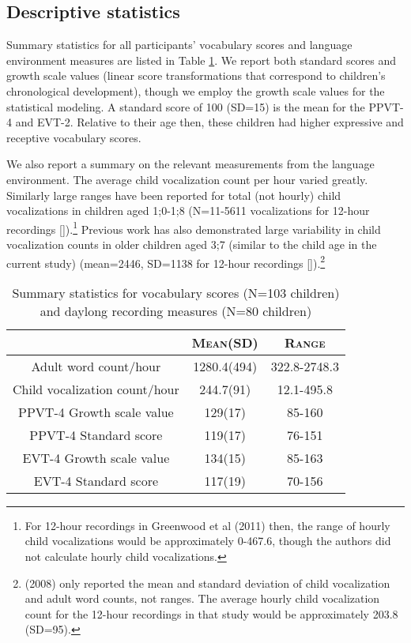 \documentclass[a4paper,man,natbib,donotrepeattitle, apacite]{apa6}
\begin{document}
\subsection{Descriptive statistics}

Summary statistics for all participants’ vocabulary scores and language environment measures are listed in Table \ref{tab:sum-stat}. We report both standard scores and growth scale values (linear score transformations that correspond to children’s chronological development), though we employ the growth scale values for the statistical modeling. A standard score of 100 (SD=15) is the mean for the PPVT-4 and EVT-2. Relative to their age then, these children had higher expressive and receptive vocabulary scores. 

We also report a summary on the relevant measurements from the language environment. The average child vocalization count per hour varied greatly. Similarly large ranges have been reported for total (not hourly) child vocalizations in children aged 1;0-1;8 (N=11-5611 vocalizations for 12-hour recordings []).\footnote{For 12-hour recordings in Greenwood et al (2011) then, the range of hourly child vocalizations would be approximately 0-467.6, though the authors did not calculate hourly child vocalizations.} Previous work has also demonstrated large variability in child vocalization counts in older children aged 3;7 (similar to the child age in the current study) (mean=2446, SD=1138 for 12-hour recordings []).\footnote{\citeauthor{gilkersonLENANaturalLanguage2008} (2008) only reported the mean and standard deviation of child vocalization and adult word counts, not ranges. The average hourly child vocalization count for the 12-hour recordings in that study would be approximately 203.8 (SD=95).}

\begin{table}
\centering
\caption{\label{tab:sum-stat}Summary statistics for vocabulary scores (N=103 children) and 
daylong recording measures (N=80 children)}

\begin{tabular}{c | c | c } 
\hline
 & \textsc{Mean(SD)} & \textsc{Range} \\
\hline
\midrule

Adult word count/hour & 1280.4(494) & 322.8-2748.3 \\
Child vocalization count/hour & 244.7(91) & 12.1-495.8 \\
PPVT-4 Growth scale value & 129(17) & 85-160 \\
PPVT-4 Standard score & 119(17) & 76-151 \\
EVT-4 Growth scale value & 134(15) & 85-163 \\
EVT-4 Standard score & 117(19) & 70-156 \\


\bottomrule
\end{tabular}
\end{table}
\end{document}
